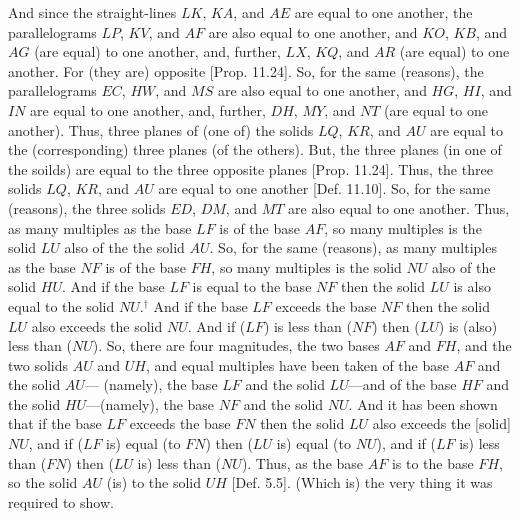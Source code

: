 \begin{Parallel}{}{}
{And since the straight-lines $LK$, $KA$, and $AE$ are equal to one another,
the parallelograms $LP$, $KV$, and $AF$ are also equal to
one another, and $KO$, $KB$, and $AG$ (are equal) to one another, and,
further, $LX$, $KQ$, and $AR$ (are equal) to one another. For (they
are) opposite [Prop. 11.24]. So, for the
same (reasons), the parallelograms $EC$, $HW$, and $MS$
are also equal to one another, and $HG$, $HI$, and $IN$ are equal to
one another, and, further, $DH$, $MY$, and $NT$ (are equal to one another).
Thus, three planes of (one of) the solids $LQ$, $KR$, and $AU$ are equal to
the (corresponding) three planes (of the others). But, the three planes
(in one of the soilds) are equal to the three opposite planes [Prop. 11.24]. Thus, the three solids $LQ$,
$KR$, and $AU$ are equal to one another [Def. 11.10]. So, for the same (reasons), the
three solids $ED$, $DM$, and $MT$ are also equal to one another.
Thus, as many multiples as the base $LF$ is of the base $AF$, so many
multiples is the solid $LU$ also of the the solid $AU$. So, for the same (reasons), 
as many multiples as the base $NF$ is of the base $FH$, so many
multiples is the solid $NU$ also of the solid $HU$. And if the base
$LF$ is equal to the base $NF$ then the solid $LU$ is also
equal to the solid $NU$.$^\dag$ And if the base $LF$  exceeds the base $NF$
then the solid $LU$ also exceeds the solid $NU$. And if ($LF$) is less than ($NF$) then ($LU$) is (also) less than ($NU$). So, there are four magnitudes, the
two bases $AF$ and $FH$, and the two solids $AU$ and $UH$, and
equal multiples have been taken of the base $AF$ and the solid $AU$--- (namely), the base $LF$ and the solid $LU$---and of the base
$HF$ and the solid $HU$---(namely), the base $NF$ and the solid $NU$.
And it has been shown that if the base $LF$ exceeds the base $FN$ then the
solid $LU$ also exceeds the [solid] $NU$, and if ($LF$ is) equal (to $FN$) then
($LU$ is) equal (to $NU$), and if ($LF$ is) less than ($FN$) then 
($LU$ is) less than ($NU$). Thus, as the base $AF$ is to the base
$FH$, so the solid $AU$ (is) to the solid $UH$ [Def. 5.5]. (Which is) the very thing it was required to show.}
\end{Parallel}


\vspace{7pt}{\footnotesize\noindent$^\dag$ Here, Euclid assumes that $LF\gtreqqless NF$ implies $LU \gtreqqless NU$. This is easily demonstrated.}

